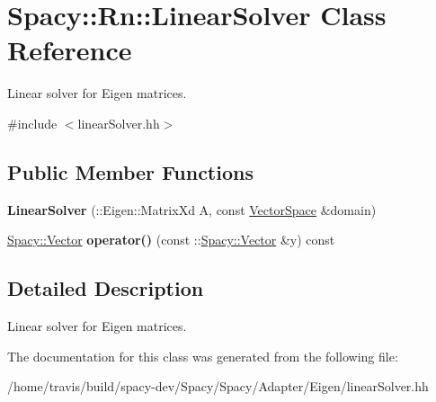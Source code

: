 \hypertarget{classSpacy_1_1Rn_1_1LinearSolver}{\section{\-Spacy\-:\-:\-Rn\-:\-:\-Linear\-Solver \-Class \-Reference}
\label{classSpacy_1_1Rn_1_1LinearSolver}
}


\-Linear solver for \-Eigen matrices.  




{\ttfamily \#include $<$linear\-Solver.\-hh$>$}

\subsection*{\-Public \-Member \-Functions}
\begin{DoxyCompactItemize}
\item 
\hypertarget{classSpacy_1_1Rn_1_1LinearSolver_ac50d2a63149b336622ecd4114d2cfe5a}{{\bfseries \-Linear\-Solver} (\-::\-Eigen\-::\-Matrix\-Xd \-A, const \hyperlink{classSpacy_1_1VectorSpace}{\-Vector\-Space} \&domain)}\label{classSpacy_1_1Rn_1_1LinearSolver_ac50d2a63149b336622ecd4114d2cfe5a}

\item 
\hypertarget{classSpacy_1_1Rn_1_1LinearSolver_a11483b4db3dd9f91ffbcea121c0eadd4}{\hyperlink{classSpacy_1_1Vector}{\-Spacy\-::\-Vector} {\bfseries operator()} (const \-::\hyperlink{classSpacy_1_1Vector}{\-Spacy\-::\-Vector} \&y) const }\label{classSpacy_1_1Rn_1_1LinearSolver_a11483b4db3dd9f91ffbcea121c0eadd4}

\end{DoxyCompactItemize}


\subsection{\-Detailed \-Description}
\-Linear solver for \-Eigen matrices. 

\-The documentation for this class was generated from the following file\-:\begin{DoxyCompactItemize}
\item 
/home/travis/build/spacy-\/dev/\-Spacy/\-Spacy/\-Adapter/\-Eigen/linear\-Solver.\-hh\end{DoxyCompactItemize}
